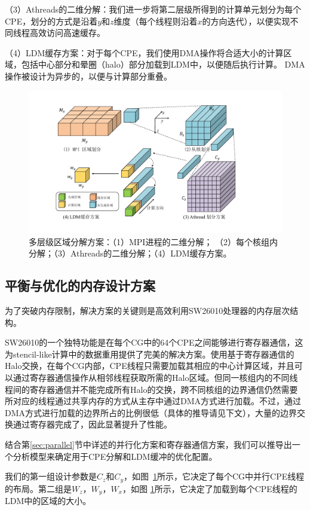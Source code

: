 \documentclass[degree=doctor]{thuthesis}
\begin{document}
（3）Athreads的二维分解：我们进一步将第二层级所得到的计算单元划分为每个CPE，划分的方式是沿着$ y $和$ z $维度（每个线程则沿着$ x $的方向迭代），以便实现不同线程高效访问高速缓存。

（4）LDM缓存方案：对于每个CPE，我们使用DMA操作将合适大小的计算区域，包括中心部分和晕圈（halo）部分加载到LDM中，以便随后执行计算。 DMA操作被设计为异步的，以便与计算部分重叠。

\begin{figure}[h]
\centering
\includegraphics[width=0.9\columnwidth]{blocking.pdf}
\caption{多层级区域分解方案：（1）MPI进程的二维分解； （2）每个核组内分解；（3）Athreads的二维分解；（4）LDM缓存方案。}
\label{fig:dd}
\end{figure}

\subsection{平衡与优化的内存设计方案}
\label{sec:mem-redesign}

为了突破内存限制，解决方案的关键则是高效利用SW26010处理器的内存层次结构。

SW26010的一个独特功能是在每个CG中的64个CPE之间能够进行寄存器通信，这为stencil-like计算中的数据重用提供了完美的解决方案。使用基于寄存器通信的Halo交换，在每个CG内部，CPE线程只需要加载其相应的中心计算区域，并且可以通过寄存器通信操作从相邻线程获取所需的Halo区域。但同一核组内的不同线程间的寄存器通信并不能完成所有Halo的交换，跨不同核组的边界通信仍然需要所对应的线程通过共享内存的方式从主存中通过DMA方式进行加载。不过，通过DMA方式进行加载的边界所占的比例很低（具体的推导请见下文），大量的边界交换通过寄存器完成了，因此显著提升了性能。

结合第\ref {sec:parallel}节中详述的并行化方案和寄存器通信方案，我们可以推导出一个分析模型来确定用于CPE分解和LDM缓冲的优化配置。

我们的第一组设计参数是$ C_z $和$ C_y $，如图~\ref{fig:dd}所示，它决定了每个CG中并行CPE线程的布局。第二组是$ W_z $，$ W_y $，$ W_x $，如图 \ref {fig:dd}所示，它决定了加载到每个CPE线程的LDM中的区域的大小。
\end{document}
